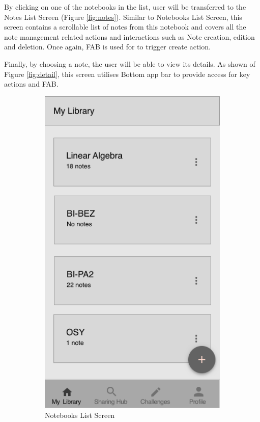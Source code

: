 \documentclass[thesis=B,english]{FITthesis}[2012/10/20]
\begin{document}
	By clicking on one of the notebooks in the list, user will be transferred to the Notes List Screen (Figure \ref{fig:notes}). Similar to Notebooks List Screen, this screen contains a scrollable list of notes from this notebook and  covers all the note management related actions and interactions such as Note creation, edition and deletion. Once again, FAB is used for to trigger create action.
	
	Finally, by choosing a note, the user will be able to view its details. As shown of Figure \ref{fig:detail}, this screen utilises Bottom app bar to provide access for key actions and FAB.
	
\begin{figure}
\centering
\begin{subfigure}{.5\textwidth}
  \centering
  \includegraphics[scale=0.4]{Notebooks.png}
  \caption{Notebooks List Screen}
  \label{fig:notebooks}
\end{subfigure}%
\begin{subfigure}{.5\textwidth}
  \centering

\end{subfigure}
\end{figure}
\end{document}
